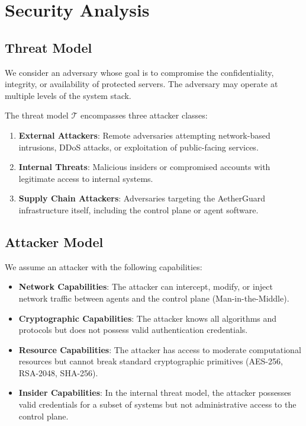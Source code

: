 
\section{Security Analysis}
\label{sec:security}

\subsection{Threat Model}
\label{subsec:threat-model}

We consider an adversary whose goal is to compromise the confidentiality, integrity, or availability of protected servers. The adversary may operate at multiple levels of the system stack.

\begin{definition}
The threat model $\mathcal{T}$ encompasses three attacker classes:
\begin{enumerate}
    \item \textbf{External Attackers}: Remote adversaries attempting network-based intrusions, DDoS attacks, or exploitation of public-facing services.
    \item \textbf{Internal Threats}: Malicious insiders or compromised accounts with legitimate access to internal systems.
    \item \textbf{Supply Chain Attackers}: Adversaries targeting the AetherGuard infrastructure itself, including the control plane or agent software.
\end{enumerate}
\end{definition}

\subsection{Attacker Model}
\label{subsec:attacker-model}

We assume an attacker with the following capabilities:

\begin{itemize}
    \item \textbf{Network Capabilities}: The attacker can intercept, modify, or inject network traffic between agents and the control plane (Man-in-the-Middle).
    \item \textbf{Cryptographic Capabilities}: The attacker knows all algorithms and protocols but does not possess valid authentication credentials.
    \item \textbf{Resource Capabilities}: The attacker has access to moderate computational resources but cannot break standard cryptographic primitives (AES-256, RSA-2048, SHA-256).
    \item \textbf{Insider Capabilities}: In the internal threat model, the attacker possesses valid credentials for a subset of systems but not administrative access to the control plane.
\end{itemize}

